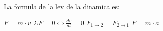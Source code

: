 
\question La formula de la ley de la dinamica es:

  \begin{oneparchoices}
    \choice $F=m \cdot v$
    \choice $\Sigma F = 0 \Leftrightarrow \frac{dv}{dt} = 0$
    \choice $F_{1 \rightarrow 2} = F_{2 \rightarrow 1}$
    \CorrectChoice $F=m \cdot a$
  \end{oneparchoices}
  \answerline[D]
